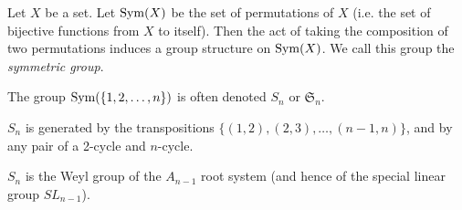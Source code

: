 \documentclass{article}
\begin{document}
Let $X$ be a set.  
Let ${\rm Sym}(X)$ be the set of permutations of $X$ 
(i.e. the set of bijective functions from $X$ to itself).  
Then the act of taking the composition of two permutations 
induces a group structure on ${\rm Sym}(X)$.  
We call this group the {\it symmetric group}.

The group ${\rm Sym}(\{1,2,\ldots, n\})$ is often denoted $S_n$ or $\mathfrak{S}_n$.

$S_n$ is generated by the transpositions $\{(1,2),(2,3),\ldots,(n-1,n)\}$,
and by any pair of a 2-cycle and $n$-cycle.

$S_n$ is the Weyl group of the $A_{n-1}$ root system (and hence of the special linear group $SL_{n-1}$).
\end{document}

